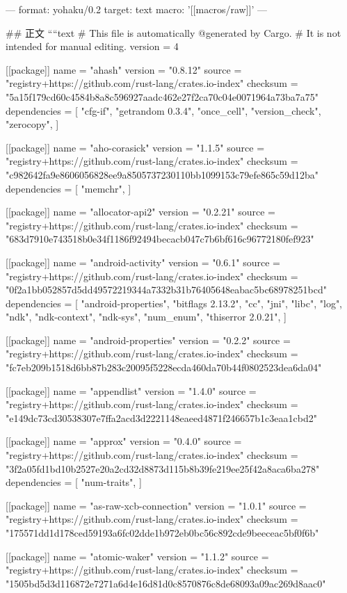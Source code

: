 ---
format: yohaku/0.2
target: text
macro: '[[macros/raw]]'
---

## 正文
````text
# This file is automatically @generated by Cargo.
# It is not intended for manual editing.
version = 4

[[package]]
name = "ahash"
version = "0.8.12"
source = "registry+https://github.com/rust-lang/crates.io-index"
checksum = "5a15f179cd60c4584b8a8c596927aadc462e27f2ca70c04e0071964a73ba7a75"
dependencies = [
 "cfg-if",
 "getrandom 0.3.4",
 "once_cell",
 "version_check",
 "zerocopy",
]

[[package]]
name = "aho-corasick"
version = "1.1.5"
source = "registry+https://github.com/rust-lang/crates.io-index"
checksum = "c982642fa9e8606056828ee9a8505737230110bb1099153c79efe865c59d12ba"
dependencies = [
 "memchr",
]

[[package]]
name = "allocator-api2"
version = "0.2.21"
source = "registry+https://github.com/rust-lang/crates.io-index"
checksum = "683d7910e743518b0e34f1186f92494becacb047c7b6bf616c96772180fef923"

[[package]]
name = "android-activity"
version = "0.6.1"
source = "registry+https://github.com/rust-lang/crates.io-index"
checksum = "0f2a1bb052857d5dd49572219344a7332b31b76405648eabac5bc68978251bcd"
dependencies = [
 "android-properties",
 "bitflags 2.13.2",
 "cc",
 "jni",
 "libc",
 "log",
 "ndk",
 "ndk-context",
 "ndk-sys",
 "num_enum",
 "thiserror 2.0.21",
]

[[package]]
name = "android-properties"
version = "0.2.2"
source = "registry+https://github.com/rust-lang/crates.io-index"
checksum = "fc7eb209b1518d6bb87b283c20095f5228ecda460da70b44f0802523dea6da04"

[[package]]
name = "appendlist"
version = "1.4.0"
source = "registry+https://github.com/rust-lang/crates.io-index"
checksum = "e149dc73cd30538307e7ffa2acd3d2221148eaeed4871f246657b1c3eaa1cbd2"

[[package]]
name = "approx"
version = "0.4.0"
source = "registry+https://github.com/rust-lang/crates.io-index"
checksum = "3f2a05fd1bd10b2527e20a2cd32d8873d115b8b39fe219ee25f42a8aca6ba278"
dependencies = [
 "num-traits",
]

[[package]]
name = "as-raw-xcb-connection"
version = "1.0.1"
source = "registry+https://github.com/rust-lang/crates.io-index"
checksum = "175571dd1d178ced59193a6fc02dde1b972eb0bc56c892cde9beeceac5bf0f6b"

[[package]]
name = "atomic-waker"
version = "1.1.2"
source = "registry+https://github.com/rust-lang/crates.io-index"
checksum = "1505bd5d3d116872e7271a6d4e16d81d0c8570876c8de68093a09ac269d8aac0"

